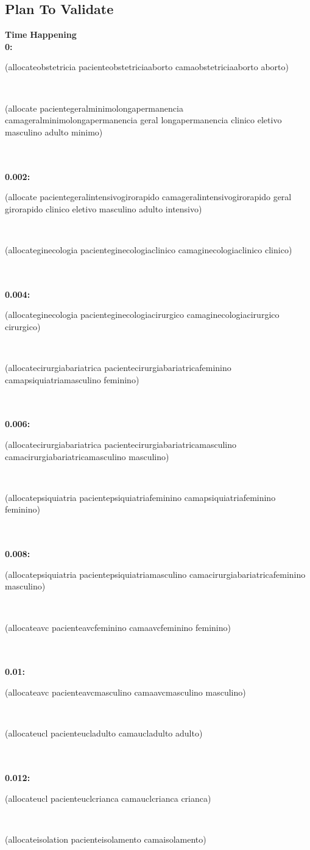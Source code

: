 \documentclass[a4paper,12pt]{article}
\newcommand{\headingtimehappening}{{\bf Time} \qquad \= {\bf Happening}\\[0.8ex]}
\newcommand{\atime}[1]{{\bf #1:}}
\newcommand{\action}[1]{{\sf #1}}
\newcommand{\listrow}[1]{\begin{minipage}[t]{11.5cm} #1 \end{minipage}}
\begin{document}
\subsection{Plan To Validate}
\begin{tabbing}
\headingtimehappening 
\atime{0}  \> \listrow{\action{(allocateobstetricia pacienteobstetriciaaborto camaobstetriciaaborto aborto)}}\\ \> \listrow{\action{(allocate pacientegeralminimolongapermanencia camageralminimolongapermanencia geral longapermanencia clinico eletivo masculino adulto minimo)}}\\
\\\atime{0.002}  \> \listrow{\action{(allocate pacientegeralintensivogirorapido camageralintensivogirorapido geral girorapido clinico eletivo masculino adulto intensivo)}}\\ \> \listrow{\action{(allocateginecologia pacienteginecologiaclinico camaginecologiaclinico clinico)}}\\
\\\atime{0.004}  \> \listrow{\action{(allocateginecologia pacienteginecologiacirurgico camaginecologiacirurgico cirurgico)}}\\ \> \listrow{\action{(allocatecirurgiabariatrica pacientecirurgiabariatricafeminino camapsiquiatriamasculino feminino)}}\\
\\\atime{0.006}  \> \listrow{\action{(allocatecirurgiabariatrica pacientecirurgiabariatricamasculino camacirurgiabariatricamasculino masculino)}}\\ \> \listrow{\action{(allocatepsiquiatria pacientepsiquiatriafeminino camapsiquiatriafeminino feminino)}}\\
\\\atime{0.008}  \> \listrow{\action{(allocatepsiquiatria pacientepsiquiatriamasculino camacirurgiabariatricafeminino masculino)}}\\ \> \listrow{\action{(allocateavc pacienteavcfeminino camaavcfeminino feminino)}}\\
\\\atime{0.01}  \> \listrow{\action{(allocateavc pacienteavcmasculino camaavcmasculino masculino)}}\\ \> \listrow{\action{(allocateucl pacienteucladulto camaucladulto adulto)}}\\
\\\atime{0.012}  \> \listrow{\action{(allocateucl pacienteuclcrianca camauclcrianca crianca)}}\\ \> \listrow{\action{(allocateisolation pacienteisolamento camaisolamento)}}\\
\end{tabbing}
\end{document}
